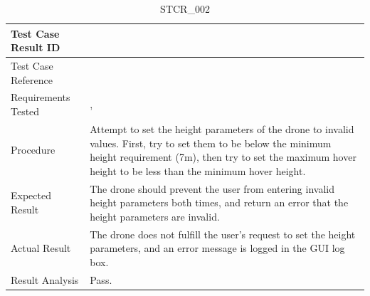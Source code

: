 \documentclass[12pt, titlepage]{article}
\begin{document}
\begin{table}[!h]
\begin{center}
\caption {STCR\_002}
\label{tab:STCR_002}
\begin{tabular}{ | m{3.2cm} | m{12.2cm} | } 
\hline
Test Case Result ID & \nameref{tab:STCR_002} \\ 
\hline
Test Case Reference & \nameref{tab:STC_002}  \\ 
\hline
Requirements Tested & \nameref{SAFE_002}, \nameref{GEN_004} \\ 
\hline
Procedure & Attempt to set the height parameters of the drone to invalid values. First, try to set them to be below the minimum height requirement (7m), then try to set the maximum hover height to be less than the minimum hover height.  \\ 
\hline
Expected Result & The drone should prevent the user from entering invalid height parameters both times, and return an error that the height parameters are invalid.   \\ 
\hline
Actual Result & The drone does not fulfill the user's request to set the height parameters, and an error message is logged in the GUI log box.  \\ 
\hline
Result Analysis & Pass.  \\ 
\hline
\end{tabular}
\end{center}
\end{table}
\end{document}
